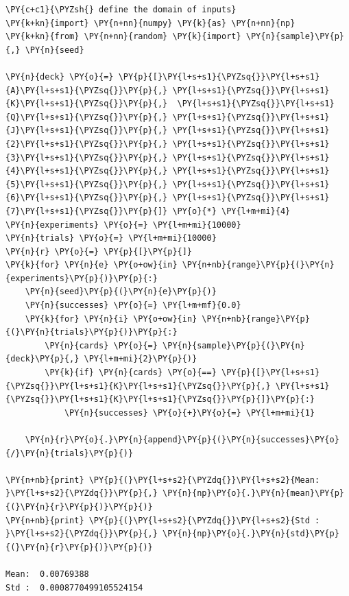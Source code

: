 \begin{codebox}[breakable, size=fbox, boxrule=1pt, pad at break*=1mm,colback=cellbackground, colframe=cellborder]
\begin{Verbatim}[commandchars=\\\{\}]
\PY{c+c1}{\PYZsh{} define the domain of inputs}
\PY{k+kn}{import} \PY{n+nn}{numpy} \PY{k}{as} \PY{n+nn}{np}
\PY{k+kn}{from} \PY{n+nn}{random} \PY{k}{import} \PY{n}{sample}\PY{p}{,} \PY{n}{seed}
	
\PY{n}{deck} \PY{o}{=} \PY{p}{[}\PY{l+s+s1}{\PYZsq{}}\PY{l+s+s1}{A}\PY{l+s+s1}{\PYZsq{}}\PY{p}{,} \PY{l+s+s1}{\PYZsq{}}\PY{l+s+s1}{K}\PY{l+s+s1}{\PYZsq{}}\PY{p}{,}  \PY{l+s+s1}{\PYZsq{}}\PY{l+s+s1}{Q}\PY{l+s+s1}{\PYZsq{}}\PY{p}{,} \PY{l+s+s1}{\PYZsq{}}\PY{l+s+s1}{J}\PY{l+s+s1}{\PYZsq{}}\PY{p}{,} \PY{l+s+s1}{\PYZsq{}}\PY{l+s+s1}{2}\PY{l+s+s1}{\PYZsq{}}\PY{p}{,} \PY{l+s+s1}{\PYZsq{}}\PY{l+s+s1}{3}\PY{l+s+s1}{\PYZsq{}}\PY{p}{,} \PY{l+s+s1}{\PYZsq{}}\PY{l+s+s1}{4}\PY{l+s+s1}{\PYZsq{}}\PY{p}{,} \PY{l+s+s1}{\PYZsq{}}\PY{l+s+s1}{5}\PY{l+s+s1}{\PYZsq{}}\PY{p}{,} \PY{l+s+s1}{\PYZsq{}}\PY{l+s+s1}{6}\PY{l+s+s1}{\PYZsq{}}\PY{p}{,} \PY{l+s+s1}{\PYZsq{}}\PY{l+s+s1}{7}\PY{l+s+s1}{\PYZsq{}}\PY{p}{]} \PY{o}{*} \PY{l+m+mi}{4}
\PY{n}{experiments} \PY{o}{=} \PY{l+m+mi}{10000}
\PY{n}{trials} \PY{o}{=} \PY{l+m+mi}{10000}
\PY{n}{r} \PY{o}{=} \PY{p}{[}\PY{p}{]}
\PY{k}{for} \PY{n}{e} \PY{o+ow}{in} \PY{n+nb}{range}\PY{p}{(}\PY{n}{experiments}\PY{p}{)}\PY{p}{:}
    \PY{n}{seed}\PY{p}{(}\PY{n}{e}\PY{p}{)}
    \PY{n}{successes} \PY{o}{=} \PY{l+m+mf}{0.0}
    \PY{k}{for} \PY{n}{i} \PY{o+ow}{in} \PY{n+nb}{range}\PY{p}{(}\PY{n}{trials}\PY{p}{)}\PY{p}{:}
        \PY{n}{cards} \PY{o}{=} \PY{n}{sample}\PY{p}{(}\PY{n}{deck}\PY{p}{,} \PY{l+m+mi}{2}\PY{p}{)}
        \PY{k}{if} \PY{n}{cards} \PY{o}{==} \PY{p}{[}\PY{l+s+s1}{\PYZsq{}}\PY{l+s+s1}{K}\PY{l+s+s1}{\PYZsq{}}\PY{p}{,} \PY{l+s+s1}{\PYZsq{}}\PY{l+s+s1}{K}\PY{l+s+s1}{\PYZsq{}}\PY{p}{]}\PY{p}{:}
            \PY{n}{successes} \PY{o}{+}\PY{o}{=} \PY{l+m+mi}{1}
	
    \PY{n}{r}\PY{o}{.}\PY{n}{append}\PY{p}{(}\PY{n}{successes}\PY{o}{/}\PY{n}{trials}\PY{p}{)}
	
\PY{n+nb}{print} \PY{p}{(}\PY{l+s+s2}{\PYZdq{}}\PY{l+s+s2}{Mean: }\PY{l+s+s2}{\PYZdq{}}\PY{p}{,} \PY{n}{np}\PY{o}{.}\PY{n}{mean}\PY{p}{(}\PY{n}{r}\PY{p}{)}\PY{p}{)}
\PY{n+nb}{print} \PY{p}{(}\PY{l+s+s2}{\PYZdq{}}\PY{l+s+s2}{Std : }\PY{l+s+s2}{\PYZdq{}}\PY{p}{,} \PY{n}{np}\PY{o}{.}\PY{n}{std}\PY{p}{(}\PY{n}{r}\PY{p}{)}\PY{p}{)}

Mean:  0.00769388
Std :  0.0008770499105524154
\end{Verbatim}
\end{codebox}

